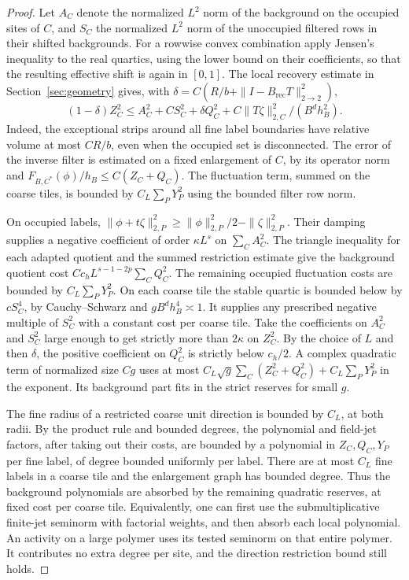 \documentclass[11pt]{article}
\theoremstyle{definition}
\begin{document}
\begin{proof}
Let \(A_C\) denote the normalized \(L^2\) norm of the
background on the occupied sites of \(C\), and \(S_C\) the
normalized \(L^2\) norm of the unoccupied filtered rows in their
shifted backgrounds. For a rowwise convex combination apply Jensen's
inequality to the real quartics, using the lower bound on their
coefficients, so that the resulting effective shift is again in
\([0,1]\). The local recovery estimate in
Section~\ref{sec:geometry} gives, with
\(\delta=C(R/b+\|I-B_{\mathrm{rec}}T\|_{2\to2}^2)\),
\begin{equation}
 (1-\delta)Z_C^2\le A_C^2+C S_C^2+\delta Q_C^2+
        C\|T\zeta\|_{2,C}^2/(B^d h_B^2).
\end{equation}
Indeed, the exceptional strips around all fine label boundaries
have relative volume at most \(CR/b\), even when the occupied
set is disconnected. The error of the inverse filter is estimated
on a fixed enlargement of \(C\), by its operator norm and
\(F_{B,C^*}(\phi)/h_B\le C(Z_C+Q_C)\). The fluctuation term,
summed on the coarse tiles, is bounded by \(C_L\sum_PY_P^2\)
using the bounded filter row norm.

On occupied labels, \(\|\phi+t\zeta\|_{2,P}^2
\ge \|\phi\|_{2,P}^2/2-\|\zeta\|_{2,P}^2\).
Their damping supplies a negative coefficient of order
\(\kappa L^s\) on \(\sum_C A_C^2\). The triangle inequality
for each adapted quotient and the summed restriction estimate give
the background quotient cost
\(C c_h L^{s-1-2p}\sum_C Q_C^2\). The remaining occupied
fluctuation costs are bounded by \(C_L\sum_P Y_P^2\).
On each coarse tile the stable quartic is bounded below by
\(c S_C^4\), by Cauchy--Schwarz and \(g B^d h_B^4\asymp 1\).
It supplies any prescribed negative multiple of \(S_C^2\) with
a constant cost per coarse tile. Take the coefficients on \(A_C^2\)
and \(S_C^2\) large enough to get strictly more than \(2\kappa\)
on \(Z_C^2\). By the choice of \(L\) and then \(\delta\),
the positive coefficient on \(Q_C^2\) is strictly below
\(c_h/2\). A complex quadratic term of normalized size \(C g\)
uses at most \(C_L\sqrt g\sum_C (Z_C^2+Q_C^2)
+C_L\sum_PY_P^2\) in the exponent. Its background part fits in
the strict reserves for small \(g\).

The fine radius of a restricted coarse unit direction is bounded
by \(C_L\), at both radii. By the product rule and bounded degrees,
the polynomial and field-jet factors, after taking out their costs,
are bounded by a polynomial in \(Z_C,Q_C,Y_P\) per fine label,
of degree bounded uniformly per label. There are at most \(C_L\)
fine labels in a coarse tile and the enlargement graph has bounded
degree. Thus the background polynomials are absorbed by the
remaining quadratic reserves, at fixed cost per coarse tile.
Equivalently, one can first use the submultiplicative finite-jet
seminorm with factorial weights, and then absorb each local
polynomial. An activity on a large polymer uses its tested
seminorm on that entire polymer. It contributes no extra degree
per site, and the direction restriction bound still holds.


\end{proof}
\end{document}
